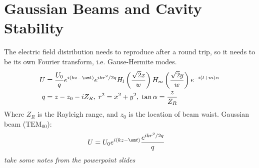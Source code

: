 \documentclass[a4paper, 11pt, normalem]{report}
\begin{document}
\chapter{Gaussian Beams and Cavity Stability}
The electric field distribution needs to reproduce after a round trip, so it needs to be its own Fourier transform, i.e. Gause-Hermite modes.
\begin{align}
    U &= \frac{U_0}{q}e^{i(kz-\om t)}e^{ikr^2/2q}H_l\left(\frac{\sqrt{2}x}{w}\right)H_m\left(\frac{\sqrt{2}y}{w}\right)e^{-i(l+m)\alpha} \\
    q &= z-z_0-iZ_R,\; r^2 = x^2+y^2,\; \tan\alpha = \frac{z}{Z_R}
\end{align}
Where $Z_R$ is the Rayleigh range, and $z_0$ is the location of beam waist.
Gaussian beam ($\text{TEM}_{00}$):
\begin{align}
    U &= U_0e^{i(kz-\om t)}\frac{e^{ikr^2/2q}}{q}
\end{align}
\textit{take some notes from the powerpoint slides}
\end{document}
